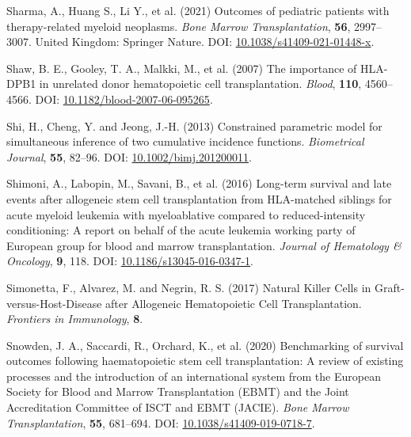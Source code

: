 \documentclass[
  letterpaper,
  paper=240mm:170mm,
  twoside=true,
  open=right,
  fontsize=10pt,
  pagesize=false,
  BCOR=15mm,
  DIV=14,
  headinclude=true,
  footinclude=false,
  headsepline=on]{scrbook}
\newlength{\cslhangindent}
\newenvironment{CSLReferences}[2] %
 {\begin{list}{}{%
  \setlength{\itemindent}{0pt}
  \setlength{\leftmargin}{0pt}
  \setlength{\parsep}{0pt}
  \ifodd #1
   \setlength{\leftmargin}{\cslhangindent}
   \setlength{\itemindent}{-1\cslhangindent}
  \fi
  \setlength{\itemsep}{#2\baselineskip}}}
 {\end{list}}
\begin{document}
\begin{CSLReferences}{1}{1}
Sharma, A., Huang S., Li Y., et al. (2021) Outcomes of pediatric
patients with therapy-related myeloid neoplasms. \emph{Bone Marrow
Transplantation}, \textbf{56}, 2997--3007. United Kingdom: Springer
Nature. DOI:
\href{https://doi.org/10.1038/s41409-021-01448-x}{10.1038/s41409-021-01448-x}.

Shaw, B. E., Gooley, T. A., Malkki, M., et al. (2007) The importance of
{HLA-DPB1} in unrelated donor hematopoietic cell transplantation.
\emph{Blood}, \textbf{110}, 4560--4566. DOI:
\href{https://doi.org/10.1182/blood-2007-06-095265}{10.1182/blood-2007-06-095265}.

Shi, H., Cheng, Y. and Jeong, J.-H. (2013) Constrained parametric model
for simultaneous inference of two cumulative incidence functions.
\emph{Biometrical Journal}, \textbf{55}, 82--96. DOI:
\href{https://doi.org/10.1002/bimj.201200011}{10.1002/bimj.201200011}.

Shimoni, A., Labopin, M., Savani, B., et al. (2016) Long-term survival
and late events after allogeneic stem cell transplantation from
{HLA-matched} siblings for acute myeloid leukemia with myeloablative
compared to reduced-intensity conditioning: A report on behalf of the
acute leukemia working party of {European} group for blood and marrow
transplantation. \emph{Journal of Hematology \& Oncology}, \textbf{9},
118. DOI:
\href{https://doi.org/10.1186/s13045-016-0347-1}{10.1186/s13045-016-0347-1}.

Simonetta, F., Alvarez, M. and Negrin, R. S. (2017) Natural {Killer
Cells} in {Graft-versus-Host-Disease} after {Allogeneic Hematopoietic
Cell Transplantation}. \emph{Frontiers in Immunology}, \textbf{8}.

Snowden, J. A., Saccardi, R., Orchard, K., et al. (2020) Benchmarking of
survival outcomes following haematopoietic stem cell transplantation:
{A} review of existing processes and the introduction of an
international system from the {European Society} for {Blood} and {Marrow
Transplantation} ({EBMT}) and the {Joint Accreditation Committee} of
{ISCT} and {EBMT} ({JACIE}). \emph{Bone Marrow Transplantation},
\textbf{55}, 681--694. DOI:
\href{https://doi.org/10.1038/s41409-019-0718-7}{10.1038/s41409-019-0718-7}.


\end{CSLReferences}
\end{document}
